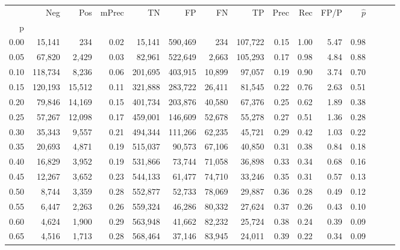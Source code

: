 \begin{tabular}{rrrrrrrrrrrrrrr}
\toprule
{} &      Neg &     Pos & mPrec &       TN &       FP &       FN &       TP &  Prec &   Rec &  FP/P & $\hat{p}$ \\
p    &          &         &       &          &          &          &          &       &       &       &           \\
\midrule
0.00 &   15,141 &     234 &  0.02 &   15,141 &  590,469 &      234 &  107,722 &  0.15 &  1.00 &  5.47 &      0.98 \\
0.05 &   67,820 &   2,429 &  0.03 &   82,961 &  522,649 &    2,663 &  105,293 &  0.17 &  0.98 &  4.84 &      0.88 \\
0.10 &  118,734 &   8,236 &  0.06 &  201,695 &  403,915 &   10,899 &   97,057 &  0.19 &  0.90 &  3.74 &      0.70 \\
0.15 &  120,193 &  15,512 &  0.11 &  321,888 &  283,722 &   26,411 &   81,545 &  0.22 &  0.76 &  2.63 &      0.51 \\
0.20 &   79,846 &  14,169 &  0.15 &  401,734 &  203,876 &   40,580 &   67,376 &  0.25 &  0.62 &  1.89 &      0.38 \\
0.25 &   57,267 &  12,098 &  0.17 &  459,001 &  146,609 &   52,678 &   55,278 &  0.27 &  0.51 &  1.36 &      0.28 \\
0.30 &   35,343 &   9,557 &  0.21 &  494,344 &  111,266 &   62,235 &   45,721 &  0.29 &  0.42 &  1.03 &      0.22 \\
0.35 &   20,693 &   4,871 &  0.19 &  515,037 &   90,573 &   67,106 &   40,850 &  0.31 &  0.38 &  0.84 &      0.18 \\
0.40 &   16,829 &   3,952 &  0.19 &  531,866 &   73,744 &   71,058 &   36,898 &  0.33 &  0.34 &  0.68 &      0.16 \\
0.45 &   12,267 &   3,652 &  0.23 &  544,133 &   61,477 &   74,710 &   33,246 &  0.35 &  0.31 &  0.57 &      0.13 \\
0.50 &    8,744 &   3,359 &  0.28 &  552,877 &   52,733 &   78,069 &   29,887 &  0.36 &  0.28 &  0.49 &      0.12 \\
0.55 &    6,447 &   2,263 &  0.26 &  559,324 &   46,286 &   80,332 &   27,624 &  0.37 &  0.26 &  0.43 &      0.10 \\
0.60 &    4,624 &   1,900 &  0.29 &  563,948 &   41,662 &   82,232 &   25,724 &  0.38 &  0.24 &  0.39 &      0.09 \\
0.65 &    4,516 &   1,713 &  0.28 &  568,464 &   37,146 &   83,945 &   24,011 &  0.39 &  0.22 &  0.34 &      0.09 \\

\end{tabular}
